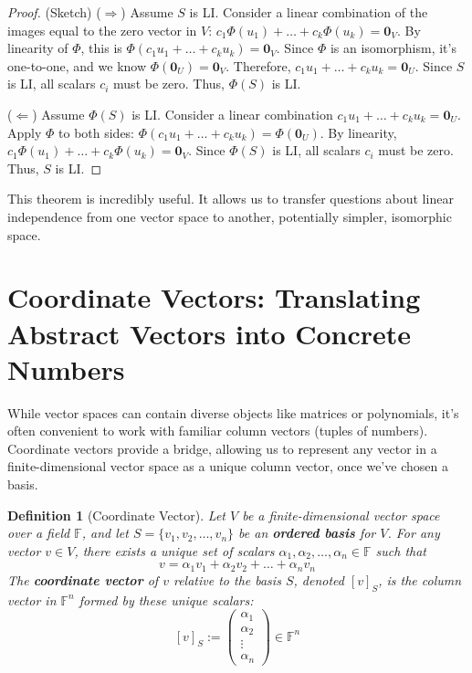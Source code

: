 \documentclass[11pt]{article}
\newtheorem{definition}[theorem]{Definition}
\theoremstyle{definition}
\theoremstyle{remark}
\newcommand{\F}{\mathbb{F}}
\newcommand{\mat}[1]{\begin{pmatrix}#1\end{pmatrix}}
\begin{document}
\begin{proof}
(Sketch)
($\Rightarrow$) Assume $S$ is LI. Consider a linear combination of the images equal to the zero vector in $V$: $c_1 \Phi(u_1) + \dots + c_k \Phi(u_k) = \mathbf{0}_V$. By linearity of $\Phi$, this is $\Phi(c_1 u_1 + \dots + c_k u_k) = \mathbf{0}_V$. Since $\Phi$ is an isomorphism, it's one-to-one, and we know $\Phi(\mathbf{0}_U) = \mathbf{0}_V$. Therefore, $c_1 u_1 + \dots + c_k u_k = \mathbf{0}_U$. Since $S$ is LI, all scalars $c_i$ must be zero. Thus, $\Phi(S)$ is LI.

($\Leftarrow$) Assume $\Phi(S)$ is LI. Consider a linear combination $c_1 u_1 + \dots + c_k u_k = \mathbf{0}_U$. Apply $\Phi$ to both sides: $\Phi(c_1 u_1 + \dots + c_k u_k) = \Phi(\mathbf{0}_U)$. By linearity, $c_1 \Phi(u_1) + \dots + c_k \Phi(u_k) = \mathbf{0}_V$. Since $\Phi(S)$ is LI, all scalars $c_i$ must be zero. Thus, $S$ is LI.
\end{proof}

This theorem is incredibly useful. It allows us to transfer questions about linear independence from one vector space to another, potentially simpler, isomorphic space.

\section{Coordinate Vectors: Translating Abstract Vectors into Concrete Numbers}

While vector spaces can contain diverse objects like matrices or polynomials, it's often convenient to work with familiar column vectors (tuples of numbers). Coordinate vectors provide a bridge, allowing us to represent any vector in a finite-dimensional vector space as a unique column vector, once we've chosen a basis.

\begin{definition}[Coordinate Vector]
Let $V$ be a finite-dimensional vector space over a field $\F$, and let $S = \{v_1, v_2, \dots, v_n\}$ be an \textbf{ordered basis} for $V$. For any vector $v \in V$, there exists a unique set of scalars $\alpha_1, \alpha_2, \dots, \alpha_n \in \F$ such that
\[ v = \alpha_1 v_1 + \alpha_2 v_2 + \dots + \alpha_n v_n \]
The \textbf{coordinate vector} of $v$ relative to the basis $S$, denoted $[v]_S$, is the column vector in $\F^n$ formed by these unique scalars:
\[ [v]_S := \mat{\alpha_1 \\ \alpha_2 \\ \vdots \\ \alpha_n} \in \F^n \]
\end{definition}
\end{document}
